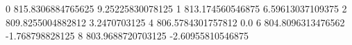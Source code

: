 0 815.8306884765625 9.25225830078125
1 813.174560546875 6.59613037109375
2 809.8255004882812 3.2470703125
4 806.5784301757812 0.0
6 804.8096313476562 -1.768798828125
8 803.9688720703125 -2.60955810546875
